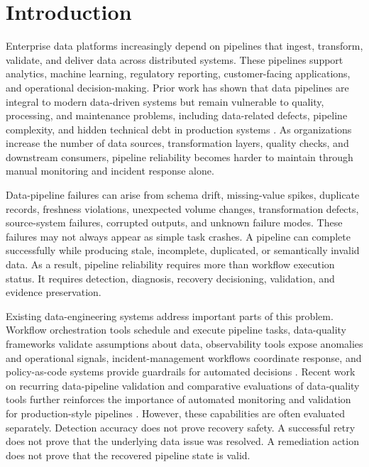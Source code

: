 \section{Introduction}
Enterprise data platforms increasingly depend on pipelines that ingest, transform, validate, and deliver data across distributed systems. These pipelines support analytics, machine learning, regulatory reporting, customer-facing applications, and operational decision-making. Prior work has shown that data pipelines are integral to modern data-driven systems but remain vulnerable to quality, processing, and maintenance problems, including data-related defects, pipeline complexity, and hidden technical debt in production systems \cite{foidl2023pipelinequality,sculley2015hidden,xin2021production}. As organizations increase the number of data sources, transformation layers, quality checks, and downstream consumers, pipeline reliability becomes harder to maintain through manual monitoring and incident response alone.

Data-pipeline failures can arise from schema drift, missing-value spikes, duplicate records, freshness violations, unexpected volume changes, transformation defects, source-system failures, corrupted outputs, and unknown failure modes. These failures may not always appear as simple task crashes. A pipeline can complete successfully while producing stale, incomplete, duplicated, or semantically invalid data. As a result, pipeline reliability requires more than workflow execution status. It requires detection, diagnosis, recovery decisioning, validation, and evidence preservation.

Existing data-engineering systems address important parts of this problem. Workflow orchestration tools schedule and execute pipeline tasks, data-quality frameworks validate assumptions about data, observability tools expose anomalies and operational signals, incident-management workflows coordinate response, and policy-as-code systems provide guardrails for automated decisions \cite{apacheairflowdags2026,greatexpectations2026,dbt2026datatests,opa2026docs,googlesre2026monitoring}. Recent work on recurring data-pipeline validation and comparative evaluations of data-quality tools further reinforces the importance of automated monitoring and validation for production-style pipelines \cite{tu2023autovalidate,rehberger2026dqtools}. However, these capabilities are often evaluated separately. Detection accuracy does not prove recovery safety. A successful retry does not prove that the underlying data issue was resolved. A remediation action does not prove that the recovered pipeline state is valid.

